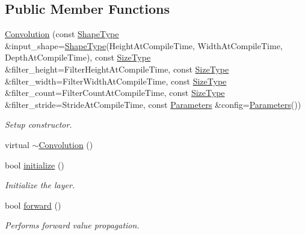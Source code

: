 \subsection*{Public Member Functions}
\begin{DoxyCompactItemize}
\item 
\hyperlink{classffnn_1_1layer_1_1_convolution_a8f0957a733070c4a80974f3e30bf0af1}{Convolution} (const \hyperlink{classffnn_1_1layer_1_1_convolution_a94fd4842bb6fd40c64b4aa52a39f450a}{Shape\-Type} \&input\-\_\-shape=\hyperlink{classffnn_1_1layer_1_1_convolution_a94fd4842bb6fd40c64b4aa52a39f450a}{Shape\-Type}(Height\-At\-Compile\-Time, Width\-At\-Compile\-Time, Depth\-At\-Compile\-Time), const \hyperlink{classffnn_1_1layer_1_1_convolution_ab0f68575e459597264bbe4451a6299bd}{Size\-Type} \&filter\-\_\-height=Filter\-Height\-At\-Compile\-Time, const \hyperlink{classffnn_1_1layer_1_1_convolution_ab0f68575e459597264bbe4451a6299bd}{Size\-Type} \&filter\-\_\-width=Filter\-Width\-At\-Compile\-Time, const \hyperlink{classffnn_1_1layer_1_1_convolution_ab0f68575e459597264bbe4451a6299bd}{Size\-Type} \&filter\-\_\-count=Filter\-Count\-At\-Compile\-Time, const \hyperlink{classffnn_1_1layer_1_1_convolution_ab0f68575e459597264bbe4451a6299bd}{Size\-Type} \&filter\-\_\-stride=Stride\-At\-Compile\-Time, const \hyperlink{classffnn_1_1layer_1_1_convolution_af24f8cf9f456c36863d6e2d90592a057}{Parameters} \&config=\hyperlink{classffnn_1_1layer_1_1_convolution_af24f8cf9f456c36863d6e2d90592a057}{Parameters}())
\begin{DoxyCompactList}\small\item\em Setup constructor. \end{DoxyCompactList}\item 
virtual \hyperlink{classffnn_1_1layer_1_1_convolution_a24565a3177d31b9a7c7b3ade9d85cef0}{$\sim$\-Convolution} ()
\item 
bool \hyperlink{classffnn_1_1layer_1_1_convolution_aaeb9c11d69a2d37fbbe4d8d3313953d5}{initialize} ()
\begin{DoxyCompactList}\small\item\em Initialize the layer. \end{DoxyCompactList}\item 
bool \hyperlink{classffnn_1_1layer_1_1_convolution_a5abc1ff3fb9aadcb18446fa7cdcfee5f}{forward} ()
\begin{DoxyCompactList}\small\item\em Performs forward value propagation. \end{DoxyCompactList}\item 

\end{DoxyCompactItemize}

